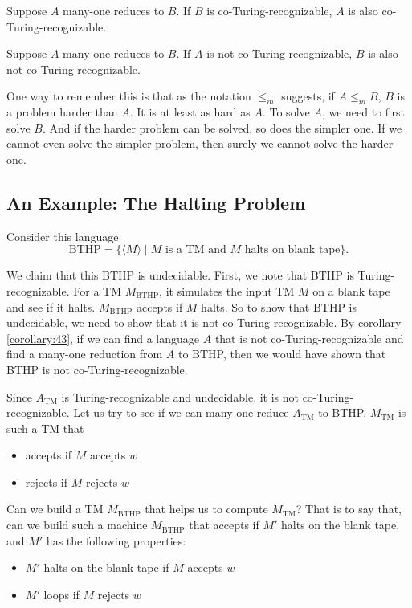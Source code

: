 \documentclass[11pt]{article}
\begin{document}
\begin{corollary}
Suppose $A$ many-one reduces to $B$. If $B$ is co-Turing-recognizable, $A$ is also
co-Turing-recognizable.
\end{corollary}

\begin{corollary} \label{corollary:43}
Suppose $A$ many-one reduces to $B$. If $A$ is not co-Turing-recognizable, $B$ is also not
co-Turing-recognizable.
\end{corollary}

One way to remember this is that as the notation $\leq_m$ suggests, if $A \leq_m B$, $B$ is a
problem harder than $A$. It is at least as hard as $A$. To solve $A$, we need to first solve $B$.
And if the harder problem can be solved, so does the simpler one. If we cannot even solve the
simpler problem, then surely we cannot solve the harder one.

\subsection{An Example: The Halting Problem}

Consider this language
\[
  \mathrm{BTHP} = \{\langle M \rangle \mid M \text{ is a TM and } M \text{ halts on blank tape}\}.
\]

We claim that this BTHP is undecidable. First, we note that BTHP is Turing-recognizable. For a
TM $M_{\mathrm{BTHP}}$, it simulates the input TM $M$ on a blank tape and see if it halts. $M_{\mathrm{BTHP}}$ accepts
if $M$ halts. So to show that BTHP is undecidable, we need to show that it is not
co-Turing-recognizable. By corollary \ref{corollary:43}, if we can find a language $A$ that is not
co-Turing-recognizable and find a many-one reduction from $A$ to BTHP, then we would have shown
that BTHP is not co-Turing-recognizable.

Since $A_{\mathrm{TM}}$ is Turing-recognizable and undecidable, it is not co-Turing-recognizable. Let us try
to see if we can many-one reduce $A_{\mathrm{TM}}$ to BTHP. $M_{\mathrm{TM}}$ is such a TM that
\begin{itemize}
\item accepts if $M$ accepts $w$
\item rejects if $M$ rejects $w$
\end{itemize}

Can we build a TM $M_{\mathrm{BTHP}}$ that helps us to compute $M_{\mathrm{TM}}$? That is to say that, can we build
such a machine $M_{\mathrm{BTHP}}$ that accepts if $M'$ halts on the blank tape, and $M'$ has the following
properties:
\begin{itemize}
\item $M'$ halts on the blank tape if $M$ accepts $w$
\item $M'$ loops if $M$ rejects $w$
\end{itemize}
\end{document}
